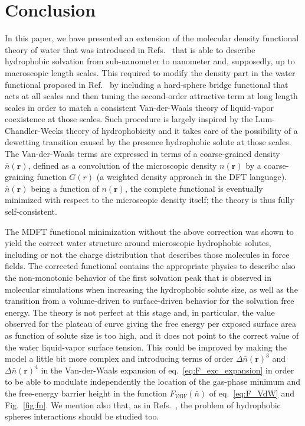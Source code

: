 \documentclass[aip,jcp,showpacs,amsmath,amssymb,superscriptaddress]{revtex4-1}
\newcommand{\rhon}{{n\left({\mathbf r}\right)}}
\newcommand{\rhonbar}{\bar{n}({\mathbf r})}
\begin{document}
\section{Conclusion}

In this paper, we have presented an extension of the molecular density functional theory of water that was introduced in Refs.~ that is able to describe hydrophobic solvation from sub-nanometer to nanometer and, supposedly, up to macroscopic length scales.  This required to modify the density part in the water functional proposed in Ref.~ by including a hard-sphere bridge functional that acts at all scales and then tuning the second-order attractive term at long length scales in order to match a  consistent Van-der-Waals theory of liquid-vapor coexistence at those scales. Such procedure is largely inspired  by the Lum-Chandler-Weeks theory of hydrophobicity and it takes care of the possibility of a dewetting transition caused by the presence hydrophobic solute at those scales.  The Van-der-Waals terms are expressed in terms of a  coarse-grained density $\rhonbar$, defined as a convolution of the microscopic density $\rhon$ by a coarse-graining function $G(r)$ (a  weighted density  approach in the DFT language\cite{sun01}). $\rhonbar$ being a function of $\rhon$, the complete functional is eventually minimized with respect to the microscopic density itself; the theory is thus fully self-consistent.

The MDFT functional minimization without the above correction was shown to yield the correct water structure around microscopic hydrophobic solutes, including or not the charge distribution that describes those molecules in force fields. The corrected functional contains the appropriate physics to describe also the non-monotonic behavior of the first solvation peak that is observed in molecular simulations when increasing the hydrophobic solute size, as well as the transition from a volume-driven to surface-driven behavior for the solvation free energy. The theory is not perfect at this stage and, in particular,  the value observed for the plateau of curve giving the free energy per exposed surface area  as function of solute size is too high, and  it does not point to the correct value of the water liquid-vapor surface tension. This could be improved by making the model  a little bit more complex and introducing terms of order $\Delta \rhonbar^3$ and  $\Delta \rhonbar^4$ in the Van-der-Waals expansion of eq.~\ref{eq:F_exc_expansion} in order to be able to modulate independently the location of the gas-phase minimum and the free-energy barrier height in the function $F_{VdW}(\bar{n})$ of eq.~\ref{eq:F_VdW} and Fig.~\ref{fig:fn}. We mention also that, as in Refs.~, the problem of hydrophobic spheres interactions should be studied too.
\end{document}
